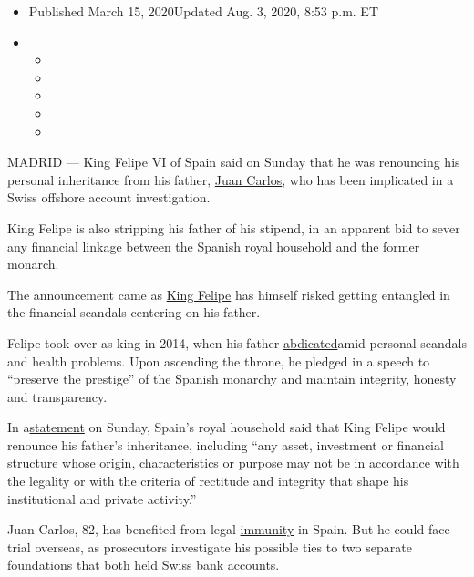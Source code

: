 \begin{itemize}
\item
  Published March 15, 2020Updated Aug. 3, 2020, 8:53 p.m. ET
\item
  \begin{itemize}
  \item
  \item
  \item
  \item
  \item
  \end{itemize}
\end{itemize}

MADRID --- King Felipe VI of Spain said on Sunday that he was renouncing
his personal inheritance from his father,
\href{https://www.nytimes.com/2020/08/03/world/europe/juan-carlos-leaves-spain.html}{Juan
Carlos}, who has been implicated in a Swiss offshore account
investigation.

King Felipe is also stripping his father of his stipend, in an apparent
bid to sever any financial linkage between the Spanish royal household
and the former monarch.

The announcement came as
\href{https://www.nytimes.com/2014/06/19/world/europe/political-tensions-certain-to-test-crown-prince-felipe-spains-new-king.html}{King
Felipe} has himself risked getting entangled in the financial scandals
centering on his father.

Felipe took over as king in 2014, when his father
\href{https://www.nytimes.com/2014/06/12/world/europe/spanish-lawmakers-clear-way-for-kings-abdication.html}{abdicated}amid
personal scandals and health problems. Upon ascending the throne, he
pledged in a speech to ``preserve the prestige'' of the Spanish monarchy
and maintain integrity, honesty and transparency.

In
a\href{https://www.casareal.es/ES/AreaPrensa/Paginas/area_prensa_comunicados_interior.aspx?data=112}{statement}
on Sunday, Spain's royal household said that King Felipe would renounce
his father's inheritance, including ``any asset, investment or financial
structure whose origin, characteristics or purpose may not be in
accordance with the legality or with the criteria of rectitude and
integrity that shape his institutional and private activity.''

Juan Carlos, 82, has benefited from legal
\href{https://www.nytimes.com/2014/07/10/world/europe/plan-to-give-former-king-immunity-splits-spain.html}{immunity}
in Spain. But he could face trial overseas, as prosecutors investigate
his possible ties to two separate foundations that both held Swiss bank
accounts.

